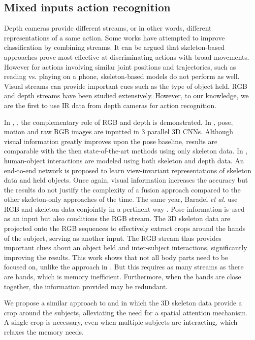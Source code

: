 \documentclass[letterpaper, 10 pt, conference]{ieeeconf}
\begin{document}
\subsection{Mixed inputs action recognition}

Depth cameras provide different streams, or in other words, different representations of a same action. Some works have attempted to improve classification by combining streams. It can be argued that skeleton-based approaches prove most effective at discriminating actions with broad movements. However for actions involving similar joint positions and trajectories, such as reading vs. playing on a phone, skeleton-based models do not perform as well. Visual streams can provide important cues such as the type of object held. RGB and depth streams have been studied extensively. However, to our knowledge, we are the first to use IR data from depth cameras for action recognition.

In \cite{hu2018deep}, \cite{shahroudy2017deep}, \cite{wang2018cooperative} the complementary role of RGB and depth is demonstrated. In \cite{zolfaghari2017chained}, pose, motion and raw RGB images are inputted in 3 parallel 3D CNNs. Although visual information greatly improves upon the pose baseline, results are comparable with the then state-of-the-art methods using only skeleton data. In \cite{rahmani2017learning}, human-object interactions are modeled using both skeleton and depth data. An end-to-end network is proposed to learn view-invariant representations of skeleton data and held objects. Once again, visual information increases the accuracy but the results do not justify the complexity of a fusion approach compared to the other skeleton-only approaches of the time. The same year, Baradel \textit{et al.} use RGB and skeleton data conjointly in a pertinent way \cite{baradel2017pose}. Pose information is used as an input but also conditions the RGB stream. The 3D skeleton data are projected onto the RGB sequences to effectively extract crops around the hands of the subject, serving as another input. The RGB stream thus provides important clues about an object held and inter-subject interactions, significantly improving the results. This work shows that not all body parts need to be focused on, unlike the approach in \cite{rahmani2017learning}. But this requires as many streams as there are hands, which is memory inefficient. Furthermore, when the hands are close together, the information provided may be redundant. 

We propose a similar approach to \cite{baradel2017pose} and \cite{rahmani2017learning} in which the 3D skeleton data provide a crop around the subjects, alleviating the need for a spatial attention mechanism. A single crop is necessary, even when multiple subjects are interacting, which relaxes the memory needs.
\end{document}
